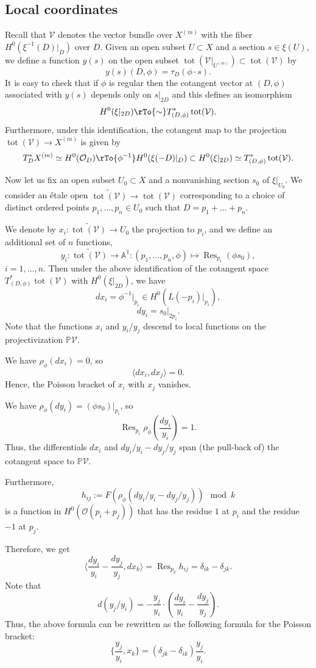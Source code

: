 \documentclass[reqno]{amsart}
\theoremstyle{definition}
\theoremstyle{remark}
\newcommand{\tot}{\operatorname{tot}}
\renewcommand{\P}{{\mathbb P}}
\newcommand{\A}{{\mathbb A}}
\newcommand{\wt}{\widetilde}
\newcommand{\VV}{{\mathcal V}}
\newcommand{\OO}{{\mathcal O}}
\newcommand{\de}{\delta}
\newcommand{\sub}{\subset}
\newcommand{\Res}{\operatorname{Res}}
\newcommand{\om}{\omega}
\newcommand{\lan}{\langle}
\newcommand{\ran}{\rangle}
\numberwithin{equation}{section}
\begin{document}
 \subsection{Local coordinates}

Recall that $\VV$ denotes the vector bundle over $X^{(m)}$ with the fiber $H^0(\xi^{-1}(D)|_D)$ over $D$.
Given an open subset $U\sub X$ and a section $s\in \xi(U)$, we define a function $y(s)$ on the open subset 
$\tot(\VV|_{U^{(m)}})\sub \tot(\VV)$ by
$$y(s)(D,\phi)=\tau_D(\phi\cdot s).$$
It is easy to check that if $\phi$ is regular then the cotangent vector at $(D,\phi)$ associated with $y(s)$ depends only on
$s|_{2D}$ and this defines an isomorphism
$$H^0(\xi|_{2D})\rTo{\sim} T^*_{(D,\phi)}\tot(\VV).$$
Furthermore, under this identification, the cotangent map to the projection $\tot(\VV)\to X^{(m)}$ is given by
$$T^*_D X^{(m)}\simeq H^0(\OO_D)\rTo{\phi^{-1}} H^0(\xi(-D)|_D)\sub H^0(\xi|_{2D})\simeq  T^*_{(D,\phi)}\tot(\VV).$$
 
Now let us fix an open subset  $U_0\sub X$ and a nonvanishing section $s_0$ of $\xi|_{U_0}$.
We consider an \'etale open $\wt{\tot(\VV)}\to \tot(\VV)$ corresponding to a choice of distinct ordered points 
$p_1,\ldots,p_n\in U_0$ such that $D=p_1+\ldots+p_n$.

We denote by $x_i:\wt{\tot(\VV)}\to U_0$ the projection to $p_i$, and we define an additional set of $n$ functions,
$$y_i:\wt{\tot(\VV)}\to\A^1:(p_1,\ldots,p_n,\phi)\mapsto \Res_{p_i}(\phi s_0),$$
$i=1,\ldots,n$.
Then under the above identification of the cotangent space $T^*_{(D,\phi)}\tot(\VV)$ with $H^0(\xi|_{2D})$, we have
$$dx_i=\phi^{-1}|_{p_i}\in H^0(L(-p_i)|_{p_i}),$$
$$dy_i=s_0|_{2p_i}.$$
Note that the functions $x_i$ and $y_i/y_j$ descend to local functions on the projectivization $\P \VV$.

We have $\rho_\phi(dx_i)=0$, so 
$$\lan dx_i,dx_j\ran=0.$$
Hence, the Poisson bracket of $x_i$ with $x_j$ vanishes.

We have $\rho_\phi(dy_i)=(\phi s_0)|_{p_i}$, so 
$$\Res_{p_i}\rho_\phi(\frac{dy_i}{y_i})=1.$$
Thus, the differentials $dx_i$ and $dy_i/y_i-dy_j/y_j$ span (the pull-back of) the cotangent space to $\P\VV$.

Furthermore,
$$h_{ij}:=F(\rho_\phi(dy_i/y_i-dy_j/y_j)) \mod k$$
is a function in $H^0(\OO(p_i+p_j))$ that has the residue $1$ at $p_i$ and the residue $-1$ at $p_j$.

Therefore, we get
$$\lan \frac{dy_i}{y_i}-\frac{dy_j}{y_j}, dx_k\ran=\Res_{p_k} h_{ij}=\de_{ik}-\de_{jk}.$$
Note that
$$d(y_j/y_i)=-\frac{y_j}{y_i}\cdot(\frac{dy_i}{y_i}-\frac{dy_j}{y_j}).$$
Thus, the above formula can be rewritten as the following formula for the Poisson bracket:
$$\{\frac{y_j}{y_i},x_k\}=(\de_{jk}-\de_{ik})\frac{y_j}{y_i}.$$
\end{document}
